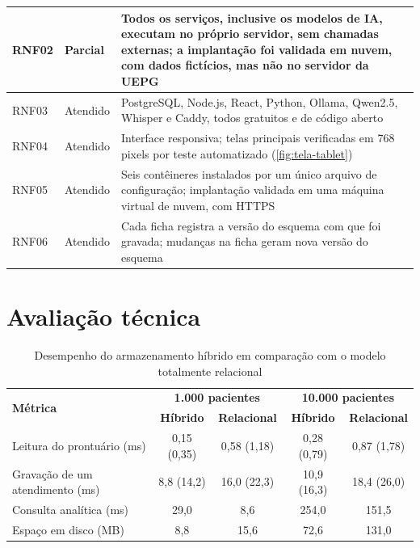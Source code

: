 \begin{quadro}[htbp]
\begin{tabularx}{\textwidth}{|L{1.2cm}|L{1.6cm}|Y|}
		RNF02 & Parcial & Todos os serviços, inclusive os modelos de IA, executam no próprio servidor, sem chamadas externas; a implantação foi validada em nuvem, com dados fictícios, mas não no servidor da UEPG \\ \hline
		RNF03 & Atendido & PostgreSQL, Node.js, React, Python, Ollama, Qwen2.5, Whisper e Caddy, todos gratuitos e de código aberto \\ \hline
		RNF04 & Atendido & Interface responsiva; telas principais verificadas em 768 pixels por teste automatizado (\autoref{fig:tela-tablet}) \\ \hline
		RNF05 & Atendido & Seis contêineres instalados por um único arquivo de configuração; implantação validada em uma máquina virtual de nuvem, com HTTPS \\ \hline
		RNF06 & Atendido & Cada ficha registra a versão do esquema com que foi gravada; mudanças na ficha geram nova versão do esquema \\ \hline
	\end{tabularx}
\end{quadro}

\section{Avaliação técnica}

\begin{table}[htbp]
	\caption{Desempenho do armazenamento híbrido em comparação com o modelo totalmente relacional}
	\label{tb:benchmark}
	\footnotesize
	\centering
	\begin{tabular}{lcccc}
		\hline
		\multirow{2}{*}{\textbf{Métrica}} & \multicolumn{2}{c}{\textbf{1.000 pacientes}} & \multicolumn{2}{c}{\textbf{10.000 pacientes}} \\ \cline{2-5}
		& \textbf{Híbrido} & \textbf{Relacional} & \textbf{Híbrido} & \textbf{Relacional} \\ \hline
		Leitura do prontuário (ms) & 0,15 (0,35) & 0,58 (1,18) & 0,28 (0,79) & 0,87 (1,78) \\
		Gravação de um atendimento (ms) & 8,8 (14,2) & 16,0 (22,3) & 10,9 (16,3) & 18,4 (26,0) \\
		Consulta analítica (ms) & 29,0 & 8,6 & 254,0 & 151,5 \\
		Espaço em disco (MB) & 8,8 & 15,6 & 72,6 & 131,0 \\ \hline
	\end{tabular}
\end{table}


